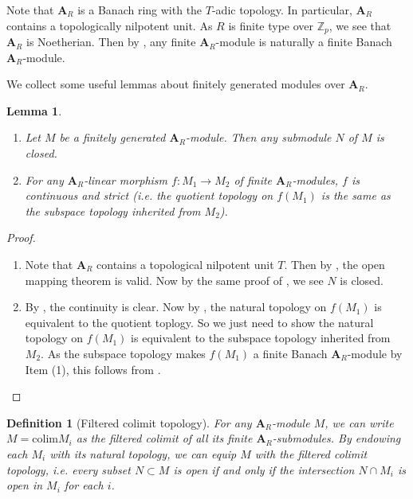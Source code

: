 \documentclass[10pt]{article}
\newtheorem{lem}[thm]{Lemma}
\newtheorem{dfn}[thm]{Definition}
\numberwithin{equation}{section}
\newcommand{\bZ}{{\mathbb Z}}
\newcommand{\colim}{{\mathrm{colim}}}       %
\newcommand{\bfA}{{\textbf{A}}}
\begin{document}
Note that $\bfA_R$ is a Banach ring with the $T$-adic topology. In particular, $\bfA_R$ contains a topologically nilpotent unit. As $R$ is finite type over $\bZ_p$, we see that $\bfA_R$ is Noetherian. Then by \cite[Remark 2.2.11]{KL15}, any finite $\bfA_R$-module is naturally a finite Banach $\bfA_R$-module.

We collect some useful lemmas about finitely generated modules over $\bfA_R$.

\begin{lem}
    \begin{enumerate}
        \item Let $M$ be a finitely generated $\bfA_R$-module. Then any submodule $N$ of $M$ is closed.
        \item For any $\bfA_R$-linear morphism $f:M_1\to M_2$ of finite $\bfA_R$-modules, $f$ is continuous and strict (i.e. the quotient topology on $f(M_1)$ is the same as the subspace topology inherited from $M_2$).
    \end{enumerate}
\end{lem}
\begin{proof}
    \begin{enumerate}
        \item Note that $\bfA_R$ contains a topological nilpotent unit $T$. Then by \cite[Lemma 2.2.6(b), Theorem 2.2.8]{KL15}, the open mapping theorem is valid. Now by the same proof of \cite[Proposition 3.7.2.1]{BGR84}, we see $N$ is closed.
        \item By  \cite[Remark 2.2.11(c)]{KL15}, the continuity is clear. Now by \cite[Theorem 2.2.8]{KL15}, the natural topology on $f(M_1)$ is equivalent to the quotient toplogy. So we just need to show the natural topology on $f(M_1)$ is equivalent to the subspace topology inherited from $M_2$. As the subspace topology makes $f(M_1)$ a finite Banach $\bfA_R$-module by Item (1), this follows from \cite[Remark 2.2.11(c)]{KL15}.
    \end{enumerate}
\end{proof}


\begin{dfn}[Filtered colimit topology]
    For any $\bfA_R$-module $M$, we can write $M=\colim M_i$ as the filtered colimit of all its finite $\bfA_R$-submodules. By endowing each $M_i$ with its natural topology, we can equip $M$ with the filtered colimit topology, i.e. every subset $N\subset M$ is open if and only if the intersection $N\cap M_i$ is open in $M_i$ for each $i$. 
\end{dfn}
\end{document}
